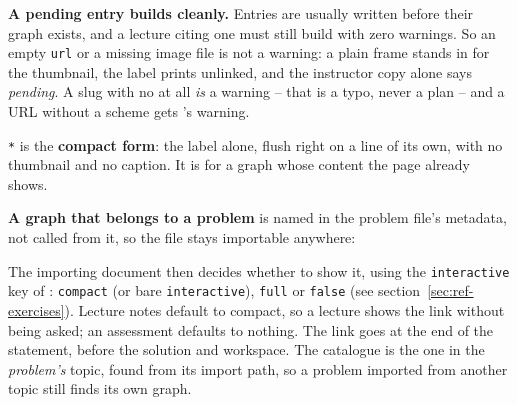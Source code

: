 \textbf{A pending entry builds cleanly.} Entries are usually written before
their graph exists, and a lecture citing one must still build with zero
warnings. So an empty \texttt{url} or a missing image file is not
a warning: a plain frame stands in for the thumbnail, the label prints
unlinked, and the instructor copy alone says \emph{pending}. A slug with
no  at all \emph{is} a warning -- that is a typo, never a
plan -- and a URL without a scheme gets 's warning.

\texttt{*} is the \textbf{compact form}: the label alone,
flush right on a line of its own, with no thumbnail and no caption. It is for
a graph whose content the page already shows.

\textbf{A graph that belongs to a problem} is named in the problem file's
metadata, not called from it, so the file stays importable anywhere:

\begin{manexsource}
\end{manexsource}

\noindent The importing document then decides whether to show it, using
the \texttt{interactive} key of : \texttt{compact} (or bare
\texttt{interactive}), \texttt{full} or \texttt{false} (see
section~\ref{sec:ref-exercises}). Lecture notes default to compact, so a
lecture shows the link without being asked; an assessment defaults to
nothing. The link goes at the end of the statement, before the solution and
workspace. The catalogue is the one in the \emph{problem's} topic, found from
its import path, so a problem imported from another topic still finds its
own graph.
